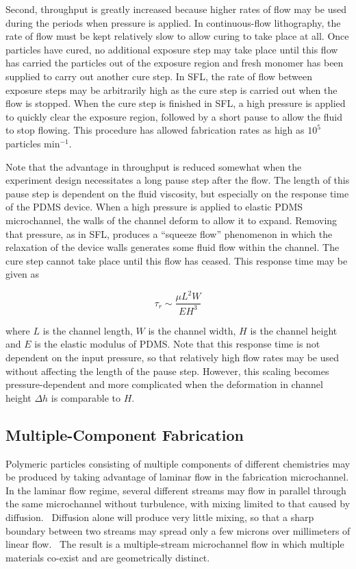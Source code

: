Second, throughput is greatly increased because higher rates of flow may be used during the periods when pressure is
applied.  In continuous-flow lithography, the rate of flow must be kept relatively slow to allow curing to take place
at all.
Once particles have cured, no 
additional exposure step may take place until this flow has carried the particles out of the
exposure region and fresh monomer has been supplied to carry out another cure step.  In SFL, the rate of flow
between exposure steps
may be arbitrarily high as the cure step is carried out when the flow is stopped. 
When the cure step is finished in SFL, a high pressure is applied to quickly clear the exposure region, followed by a 
short pause to allow the fluid to stop flowing.  This procedure has allowed fabrication rates as high as 
$10^5$ particles min$^{-1}$.~\cite{dendukuri-sfl}

Note that the advantage in throughput is reduced somewhat when the experiment design necessitates a long pause step
after the flow. The length of this pause step is dependent on the fluid viscosity, but especially on the 
response time of the PDMS device.  When a high pressure is applied to elastic PDMS microchannel, the 
walls of the channel deform to allow it to expand.  Removing that pressure, as in SFL, produces a ``squeeze flow''
phenomenon in which the relaxation of the device walls generates some fluid flow within the channel. The cure step 
cannot take place until this flow has ceased.  This response time may be given as

\begin{equation}
\tau_r \sim \frac{\mu L^2 W}{EH^3}
\end{equation}

where $L$ is the channel length, $W$ is the channel width, $H$ is the channel height and $E$ is the elastic
modulus of PDMS.  Note that this response time is not dependent on the input pressure, so that relatively high
flow rates may be used without affecting the length of the pause step. However, this scaling becomes pressure-dependent
and more complicated when the deformation in channel height $\Delta h$ is comparable to $H$.~\cite{dendukuri-sfl}

\subsection{Multiple-Component Fabrication}

Polymeric particles consisting of multiple components of different chemistries may be produced by taking advantage
of laminar flow in the fabrication microchannel.  
In the laminar flow regime, several different streams may flow in parallel through
the same microchannel without turbulence, with mixing limited to that caused by 
diffusion.~\cite{stone-laminar}  Diffusion alone
will produce very little mixing, so that a sharp boundary between two streams may spread only a few microns over
millimeters of linear flow.~\cite{mohr-flow} The result is a multiple-stream microchannel flow in which multiple materials
co-exist and are geometrically distinct.

